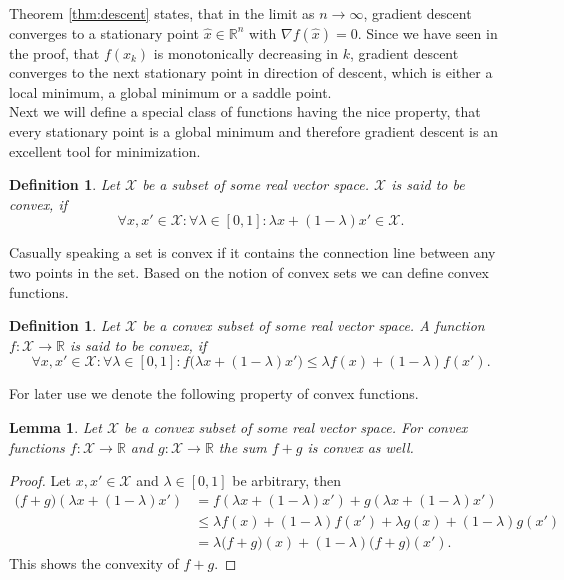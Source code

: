 \documentclass[11pt, a4paper]{article}
\newtheorem{lemma}[theorem]{Lemma}
\newtheorem{definition}[theorem]{Definition}
\newcommand{\R}{\mathds{R}}
\newcommand{\X}{\mathcal{X}}
\begin{document}
Theorem \ref{thm:descent} states, that in the limit as $n \to \infty$, gradient descent converges to a stationary point $\hat{x} \in \R^n$ with $\nabla f(\hat{x}) = 0$. Since we have seen in the proof, that $f(x_k)$ is monotonically decreasing in $k$, gradient descent converges to the next stationary point in direction of descent, which is either a local minimum, a global minimum or a saddle point. \\

Next we will define a special class of functions having the nice property, that every stationary point is a global minimum and therefore gradient descent is an excellent tool for minimization.

\begin{definition}
Let $\X$ be a subset of some real vector space. $\X$ is said to be convex, if 
\[ \forall x, x' \in \X : \forall \lambda \in [0,1] : \lambda x + (1 - \lambda) x' \in \X. \]
\end{definition}

Casually speaking a set is convex if it contains the connection line between any two points in the set. Based on the notion of convex sets we can define convex functions.

\begin{definition}
Let $\X$ be a convex subset of some real vector space. A function $f: \X \to \R$ is said to be convex, if
\[ \forall x,x' \in \X : \forall \lambda \in [0,1] : f \big (\lambda x + (1-\lambda) x' \big ) \leq \lambda f(x) + (1- \lambda) f(x'). \]
\end{definition}

For later use we denote the following property of convex functions.

\begin{lemma} \label{lem:convexity}
Let $\X$ be a convex subset of some real vector space. For convex functions $f: \X \to \R$ and $g: \X \to \R$ the sum $f+g$ is convex as well.
\end{lemma}

\begin{proof}
Let $x,x' \in \X$ and $\lambda \in [0,1]$ be arbitrary, then
\[ \begin{split}
\big ( f+g \big )(\lambda x + (1-\lambda)x') 
&= f(\lambda x + (1-\lambda)x') + g(\lambda x + (1-\lambda)x') \\\
&\leq \lambda f(x) + (1- \lambda) f(x') + \lambda g(x) + (1- \lambda) g(x') \\\
&= \lambda \big ( f+g \big ) (x) + (1- \lambda) \big ( f+g \big )(x').
\end{split} \]
This shows the convexity of $f+g$.
\end{proof}
\end{document}
